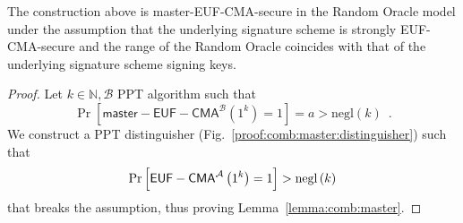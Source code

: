     \begin{lemma}
      \label{lemma:comb:master}
      The construction above is \textsf{master-EUF-CMA}-secure in the Random
      Oracle model under the assumption that the underlying signature scheme is
      strongly \textsf{EUF-CMA}-secure and the range of the Random Oracle
      coincides with that of the underlying signature scheme signing keys.
    \end{lemma}

    \begin{proof}
      Let $k \in \mathbb{N}, \mathcal{B}$ PPT algorithm such that
      \begin{equation*}
        \Pr\left[\mathsf{master-EUF-CMA}^{\mathcal{B}}\left(1^k\right) =
        1\right] = a > \mathrm{negl}\left(k\right) \enspace.
      \end{equation*}
      We construct a PPT distinguisher \adversary{}
      (Fig.~\ref{proof:comb:master:distinguisher}) such that
      \begin{equation*}
        \Pr\left[\mathsf{EUF-CMA}^{\mathcal{A}}\left(1^k\right) = 1\right] >
        \mathrm{negl}\left(k\right)
      \end{equation*}
      that breaks the assumption, thus proving Lemma~\ref{lemma:comb:master}.


\end{proof}
